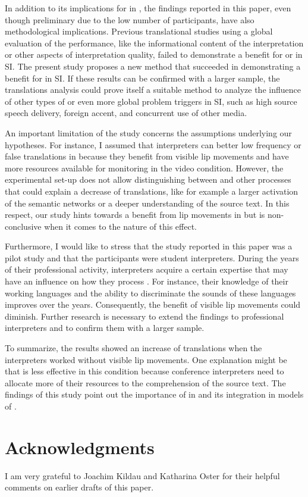 \documentclass[output=paper]{LSP/langsci}
\begin{document}
In addition to its implications for  in , the findings reported in this paper, even though preliminary due to the low number of participants, have also methodological implications. Previous translational studies using a global evaluation of the  performance, like the informational content of the interpretation or other aspects of interpretation quality, failed to demonstrate a benefit for  or  in SI. The present study proposes a new method that succeeded in demonstrating a benefit for  in SI. If these results can be confirmed with a larger sample, the  translations analysis could prove itself a suitable method to analyze the influence of other types of  or even more global problem triggers in SI, such as high source speech delivery, foreign accent, and concurrent use of other media. 

An important limitation of the study concerns the assumptions underlying our hypotheses. For instance, I assumed that interpreters can better  low frequency or false  translations in  because they benefit from visible lip movements and have more resources available for monitoring in the video condition. However, the experimental set-up does not allow distinguishing between  and other processes that could explain a decrease of  translations, like for example a larger activation of the semantic networks or a deeper understanding of the source text. In this respect, our study hints towards a benefit from lip movements in  but is non-conclusive when it comes to the nature of this effect.

Furthermore, I would like to stress that the study reported in this paper was a pilot study and that the participants were student interpreters. During the years of their professional activity, interpreters acquire a certain expertise that may have an influence on how they process . For instance, their knowledge of their working languages and the ability to discriminate the sounds of these languages improves over the years. Consequently, the benefit of visible lip movements could diminish. Further research is necessary to extend the findings to professional interpreters and to confirm them with a larger sample. 

To summarize, the results showed an increase of  translations when the interpreters worked without visible lip movements. One explanation might be that  is less effective in this condition because conference interpreters need to allocate more of their resources to the comprehension of the source text. The findings of this study point out the importance of  in  and its integration in models of .

\section*{Acknowledgments}

I am very grateful to Joachim Kildau and Katharina Oster for their helpful comments on earlier drafts of this paper.

\sloppy
\printbibliography[heading=subbibliography,notkeyword=this]
\end{document}
